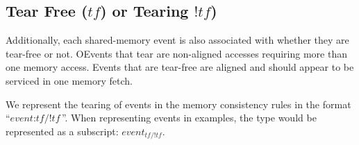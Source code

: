 
    \subsection{Tear Free ($tf$) or Tearing $!tf$)}
        Additionally, each shared-memory event is also associated with whether they are tear-free or not. OEvents that tear are non-aligned accesses requiring more than one memory access. Events that are tear-free are aligned and should appear to be serviced in one memory fetch\footnotemark.

        We represent the tearing of events in the memory consistency rules in the format ``$\textit{event} : \textit{tf/!tf}$''. 
        When representing events in examples, the type would be represented as a subscript: $\textit{event}_\textit{tf/!tf}$. 
       
                       
